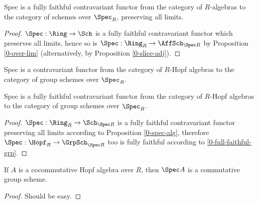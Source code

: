 \begin{proposition}
  \label{0-full-faithful-spec-alg}
  \leanok

  Spec is a fully faithful contravariant functor from the category of $R$-algebras to the category of schemes over $\Spec_R$, preserving all limits.
\end{proposition}
\begin{proof}
  \leanok

  $\Spec : \Ring \to \Sch$ is a fully faithful contravariant functor which preserves all limits, hence so is $\Spec : \Ring_R \to \AffSch_{\Spec R}$ by Proposition \ref{0-over-lim} (alternatively, by Proposition \ref{0-slice-adj}).
\end{proof}


\begin{definition}
  \label{0-spec-hopf}
  \leanok

  Spec is a contravariant functor from the category of $R$-Hopf algebras to the category of group schemes over $\Spec_R$.
\end{definition}


\begin{proposition}
  \label{0-full-faithful-spec-hopf}
  \leanok

  Spec is a fully faithful contravariant functor from the category of $R$-Hopf algebras to the category of group schemes over $\Spec_R$.
\end{proposition}
\begin{proof}
  \leanok

  $\Spec : \Ring_R \to \Sch_{\Spec R}$ is a fully faithful contravariant functor preserving all limits according to Proposition \ref{0-spec-alg}, therefore $\Spec : \Hopf_R \to \GrpSch_{\Spec R}$ too is fully faithful according to \ref{0-full-faithful-grp}.
\end{proof}

\begin{proposition}
  \label{0-cocomm-hopf-spec-comm}

  If $A$ is a cocommutative Hopf algebra over $R$, then $\Spec A$ is a commutative group scheme.
\end{proposition}
\begin{proof}
  \uses{}

  Should be easy.
\end{proof}

